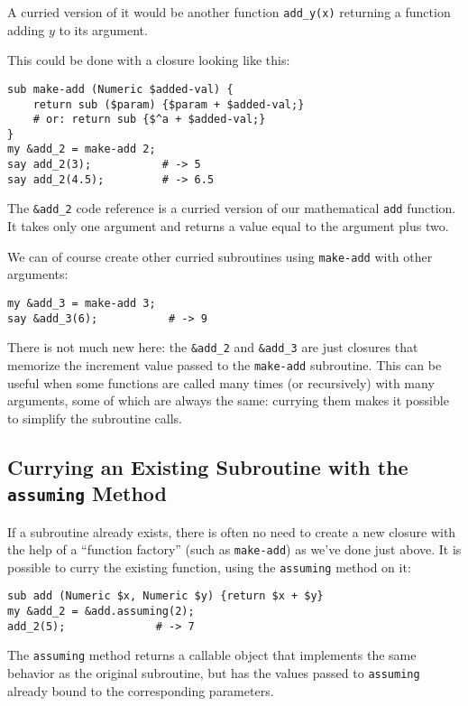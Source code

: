 A curried version of it would be another function 
\verb'add_y(x)' returning a function adding $y$ to 
its argument.

This could be done with a closure looking like this:

\begin{verbatim}
sub make-add (Numeric $added-val) {
    return sub ($param) {$param + $added-val;}    
    # or: return sub {$^a + $added-val;}
}
my &add_2 = make-add 2;
say add_2(3);           # -> 5
say add_2(4.5);         # -> 6.5
\end{verbatim}

The \verb'&add_2' code reference is a curried version 
of our mathematical {\tt add} function. It takes only 
one argument and returns a value equal to the argument 
plus two.

We can of course create other curried subroutines using 
{\tt make-add} with other arguments:

\begin{verbatim}
my &add_3 = make-add 3;
say &add_3(6);           # -> 9
\end{verbatim}

There is not much new here: the \verb'&add_2' and 
\verb'&add_3' are just closures that memorize the 
increment value passed to the {\tt make-add} 
subroutine. This can be useful when some functions 
are called many times (or recursively) with many  
arguments, some of which are always the same: 
currying them makes it possible to simplify the 
subroutine calls.

\subsection{Currying an Existing Subroutine with the {\tt assuming} Method}

If a subroutine already exists, there is often no need 
to create a new closure with the help of a ``function 
factory'' (such as {\tt make-add}) as we've done just above. 
It is possible to curry the existing function, using 
the {\tt assuming} method on it:

\begin{verbatim}
sub add (Numeric $x, Numeric $y) {return $x + $y}   
my &add_2 = &add.assuming(2);                       
add_2(5);              # -> 7                                     
\end{verbatim}

The {\tt assuming} method returns a callable object 
that implements the same behavior as the original 
subroutine, but has the values passed to {\tt assuming}
already bound to the corresponding parameters.

